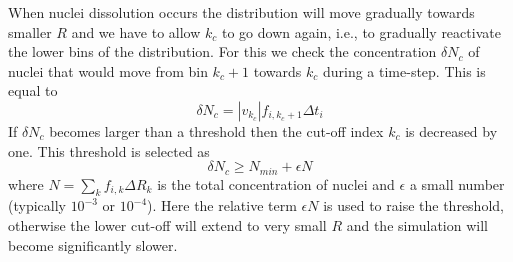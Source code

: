 \documentclass[12pt,a4paper]{article}
\begin{document}
When nuclei dissolution occurs the distribution will move gradually towards smaller $R$ and we have to allow $k_c$ to go down again, i.e., to gradually reactivate the lower bins of the distribution. For this we check the concentration $\delta N_c$ of nuclei that would move from bin $k_c+1$ towards $k_c$ during a time-step. This is equal to 
\[
\delta N_c = |v_{k_c}| f_{i,k_c+1} \Delta t_i
\] 
If $\delta N_c$ becomes larger than a threshold then the cut-off index $k_c$ is decreased by one. This threshold is selected as
\begin{equation}
\delta N_c \geq N_{min} + \epsilon N
\end{equation}
where $N = \sum_k {f_{i,k} \Delta R_k}$ is the total concentration of nuclei and $\epsilon$ a small number (typically $10^{-3}$ or $10^{-4}$). Here the relative term $\epsilon N$ is used to raise the threshold, otherwise the lower cut-off will extend to very small $R$ and the simulation will become significantly slower. 



\end{document}
